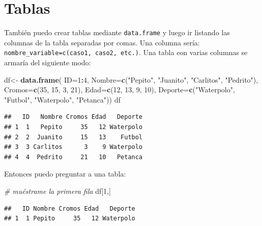 \documentclass[]{book}
\newenvironment{Shaded}{\begin{snugshade}}{\end{snugshade}}
\newcommand{\CommentTok}[1]{\textcolor[rgb]{0.56,0.35,0.01}{\textit{#1}}}
\newcommand{\DataTypeTok}[1]{\textcolor[rgb]{0.13,0.29,0.53}{#1}}
\newcommand{\DecValTok}[1]{\textcolor[rgb]{0.00,0.00,0.81}{#1}}
\newcommand{\KeywordTok}[1]{\textcolor[rgb]{0.13,0.29,0.53}{\textbf{#1}}}
\newcommand{\NormalTok}[1]{#1}
\newcommand{\OperatorTok}[1]{\textcolor[rgb]{0.81,0.36,0.00}{\textbf{#1}}}
\newcommand{\StringTok}[1]{\textcolor[rgb]{0.31,0.60,0.02}{#1}}
\theoremstyle{definition}
\theoremstyle{definition}
\theoremstyle{definition}
\theoremstyle{remark}
\begin{document}
\hypertarget{tablas}{%
\section{Tablas}\label{tablas}}

También puedo crear tablas mediante \texttt{data.frame} y luego ir
listando las columnas de la tabla separadas por comas. Una columna
sería: \texttt{nombre\_variable=c(caso1,\ caso2,\ etc.)}. Una tabla con
varias columnas se armaría del siguiente modo:

\begin{Shaded}
\begin{Highlighting}[]
\NormalTok{df<-}\StringTok{ }\KeywordTok{data.frame}\NormalTok{( }\DataTypeTok{ID=}\DecValTok{1}\OperatorTok{:}\DecValTok{4}\NormalTok{,}
     \DataTypeTok{Nombre=}\KeywordTok{c}\NormalTok{(}\StringTok{"Pepito"}\NormalTok{, }\StringTok{"Juanito"}\NormalTok{, }\StringTok{"Carlitos"}\NormalTok{, }\StringTok{"Pedrito"}\NormalTok{),}
     \DataTypeTok{Cromos=}\KeywordTok{c}\NormalTok{(}\DecValTok{35}\NormalTok{, }\DecValTok{15}\NormalTok{, }\DecValTok{3}\NormalTok{, }\DecValTok{21}\NormalTok{), }
     \DataTypeTok{Edad=}\KeywordTok{c}\NormalTok{(}\DecValTok{12}\NormalTok{, }\DecValTok{13}\NormalTok{, }\DecValTok{9}\NormalTok{, }\DecValTok{10}\NormalTok{),}
     \DataTypeTok{Deporte=}\KeywordTok{c}\NormalTok{(}\StringTok{"Waterpolo"}\NormalTok{, }\StringTok{"Futbol"}\NormalTok{, }\StringTok{"Waterpolo"}\NormalTok{, }\StringTok{"Petanca"}\NormalTok{))     }
\NormalTok{df}
\end{Highlighting}
\end{Shaded}

\begin{verbatim}
##   ID   Nombre Cromos Edad   Deporte
## 1  1   Pepito     35   12 Waterpolo
## 2  2  Juanito     15   13    Futbol
## 3  3 Carlitos      3    9 Waterpolo
## 4  4  Pedrito     21   10   Petanca
\end{verbatim}

Entonces puedo preguntar a una tabla:

\begin{Shaded}
\begin{Highlighting}[]
\CommentTok{# muéstrame la primera fila}
\NormalTok{df[}\DecValTok{1}\NormalTok{,] }
\end{Highlighting}
\end{Shaded}

\begin{verbatim}
##   ID Nombre Cromos Edad   Deporte
## 1  1 Pepito     35   12 Waterpolo
\end{verbatim}
\end{document}
